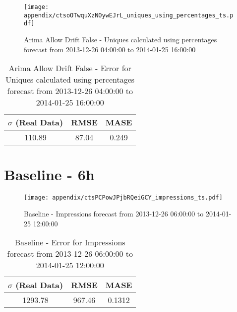 \begin{figure}[H] \begin{center} \leavevmode
\texttt{[image: appendix/ctsoOTwquXzNOywEJrL\_uniques\_using\_percentages\_ts.pdf]} \caption[]{
Arima Allow Drift False - Uniques calculated using percentages forecast from 2013-12-26 04:00:00 to 2014-01-25 16:00:00} \label{fig:appendix/ctsoOTwquXzNOywEJrL_uniques_using_percentages_ts.pdf} \end{center}
\end{figure}

\begin{table}[H]
\centering
\footnotesize
\begin{tabular}{ccc}
$\sigma$ (Real Data) & RMSE & MASE   \\ \hline
110.89 & 87.04 & 0.249 \\
\end{tabular}

\vspace{0.5cm}

\caption[]{
Arima Allow Drift False - Error for Uniques calculated using percentages forecast from 2013-12-26 04:00:00 to 2014-01-25 16:00:00}
\end{table}

\section{Baseline - 6h}
\begin{figure}[H] \begin{center} \leavevmode
\texttt{[image: appendix/ctsPCPowJPjbRQeiGCY\_impressions\_ts.pdf]} \caption[]{
Baseline - Impressions forecast from 2013-12-26 06:00:00 to 2014-01-25 12:00:00} \label{fig:appendix/ctsPCPowJPjbRQeiGCY_impressions_ts.pdf} \end{center}
\end{figure}

\begin{table}[H]
\centering
\footnotesize
\begin{tabular}{ccc}
$\sigma$ (Real Data) & RMSE & MASE   \\ \hline
1293.78 & 967.46 & 0.1312 \\
\end{tabular}

\vspace{0.5cm}

\caption[]{
Baseline - Error for Impressions forecast from 2013-12-26 06:00:00 to 2014-01-25 12:00:00}
\end{table}

